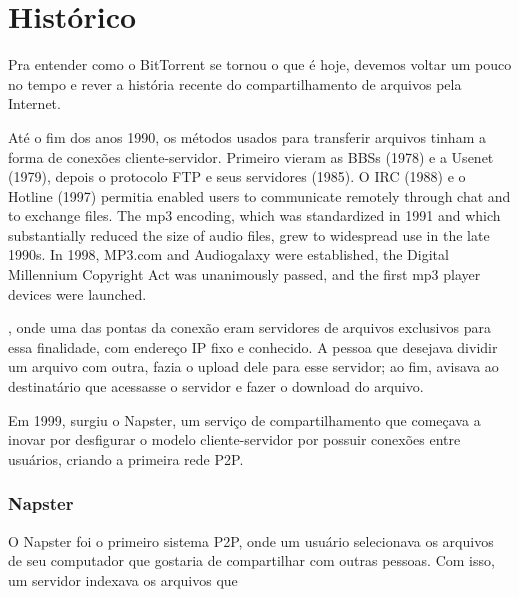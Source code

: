 \chapter{Histórico}

Pra entender como o BitTorrent se tornou o que é hoje, devemos voltar um pouco no tempo e rever a história recente do compartilhamento de arquivos pela Internet. 

Até o fim dos anos 1990, os métodos usados para transferir arquivos tinham a forma de conexões cliente-servidor. Primeiro vieram as BBSs (1978) e a Usenet (1979), depois o protocolo FTP e seus servidores (1985). O IRC (1988) e o  Hotline (1997) permitia enabled users to communicate remotely through chat and to exchange files. The mp3 encoding, which was standardized in 1991 and which substantially reduced the size of audio files, grew to widespread use in the late 1990s. In 1998, MP3.com and Audiogalaxy were established, the Digital Millennium Copyright Act was unanimously passed, and the first mp3 player devices were launched.



, onde uma das pontas da conexão eram servidores de arquivos exclusivos para essa finalidade, com endereço IP fixo e conhecido. A pessoa que desejava dividir um arquivo com outra, fazia o upload dele para esse servidor; ao fim, avisava ao destinatário que acessasse o servidor e fazer o download do arquivo. 


Em 1999, surgiu o Napster, um serviço  de compartilhamento que começava a inovar por desfigurar o modelo cliente-servidor por possuir conexões entre usuários, criando a primeira rede P2P.

\subsection{Napster}

O Napster foi o primeiro sistema P2P, onde um usuário selecionava os arquivos de seu computador que gostaria de compartilhar com outras pessoas. Com isso, um servidor indexava os arquivos que